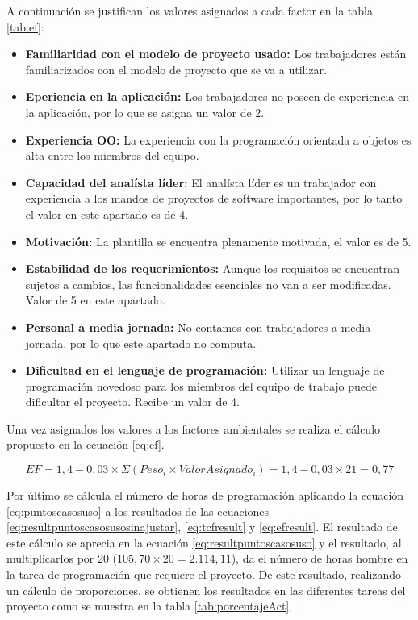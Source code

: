 \bigskip
\par A continuación se justifican los valores asignados a cada factor en la tabla \ref{tab:ef}:
\begin{itemize}[-]
  \item \textbf{Familiaridad con el modelo de proyecto usado:} Los trabajadores están familiarizados con el modelo de proyecto que se va a utilizar.
  \item \textbf{Eperiencia en la aplicación:} Los trabajadores no poseen de experiencia en la aplicación, por lo que se asigna un valor de 2.
  \item \textbf{Experiencia OO:} La experiencia con la programación orientada a objetos es alta entre los miembros del equipo.
  \item \textbf{Capacidad del analísta líder:} El analísta líder es un trabajador con experiencia a los mandos de proyectos de software importantes, por lo tanto el valor en este apartado es de 4.
  \item \textbf{Motivación:} La plantilla se encuentra plenamente motivada, el valor es de 5.
  \item \textbf{Estabilidad de los requerimientos:} Aunque los requisitos se encuentran sujetos a cambios, las funcionalidades esenciales no van a ser modificadas. Valor de 5 en este apartado.
  \item \textbf{Personal a media jornada:} No contamos con trabajadores a media jornada, por lo que este apartado no computa.
  \item \textbf{Dificultad en el lenguaje de programación:} Utilizar un lenguaje de programación novedoso para los miembros del equipo de trabajo puede dificultar el proyecto. Recibe un valor de 4.
\end{itemize}

\par Una vez asignados los valores a los factores ambientales se realiza el cálculo propuesto en la ecuación \ref{eq:ef}.

\begin{equation} \label{eq:efresult}
  EF = 1,4 - 0,03 \times \Sigma (Peso_i \times ValorAsignado_i) = 1,4 - 0,03 \times 21 = 0,77
\end{equation}

\par Por último se cálcula el número de horas de programación aplicando la ecuación \ref{eq:puntoscasosuso} a los resultados de las ecuaciones \ref{eq:resultpuntoscasosusosinajustar}, \ref{eq:tcfresult} y \ref{eq:efresult}. El resultado de este cálculo se aprecia en la ecuación \ref{eq:resultpuntoscasosuso} y el resultado, al multiplicarlos por 20 ($105,70\times20=2.114,11$), da el número de horas hombre en la tarea de programación que requiere el proyecto. De este resultado, realizando un cálculo de proporciones, se obtienen los resultados en las diferentes tareas del proyecto como se muestra en la tabla \ref{tab:porcentajeAct}.

